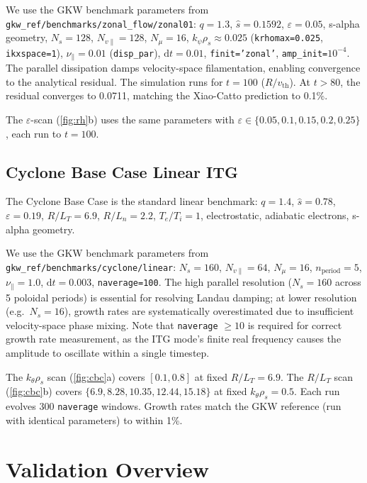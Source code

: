 \documentclass{article}
\theoremstyle{plain}
\theoremstyle{definition}
\theoremstyle{remark}
\begin{document}
We use the GKW benchmark parameters from \texttt{gkw\_ref/benchmarks/zonal\_flow/zonal01}: $q{=}1.3$, $\hat{s}{=}0.1592$, $\varepsilon{=}0.05$, s-alpha geometry, $N_s{=}128$, $N_{v\parallel}{=}128$, $N_\mu{=}16$, $k_\psi\rho_s{\approx}0.025$ (\texttt{krhomax=0.025}, \texttt{ikxspace=1}), $\nu_\parallel{=}0.01$ (\texttt{disp\_par}), $\mathrm{d}t{=}0.01$, \texttt{finit='zonal'}, \texttt{amp\_init=$10^{-4}$}. The parallel dissipation damps velocity-space filamentation, enabling convergence to the analytical residual. The simulation runs for $t{=}100$ ($R/v_\text{th}$). At $t{>}80$, the residual converges to 0.0711, matching the Xiao-Catto prediction to 0.1\%.

The $\varepsilon$-scan (\cref{fig:rh}b) uses the same parameters with $\varepsilon \in \{0.05, 0.1, 0.15, 0.2, 0.25\}$, each run to $t{=}100$.

\subsection{Cyclone Base Case Linear ITG}

The Cyclone Base Case \cite{cbc} is the standard linear benchmark: $q{=}1.4$, $\hat{s}{=}0.78$, $\varepsilon{=}0.19$, $R/L_T{=}6.9$, $R/L_n{=}2.2$, $T_e/T_i{=}1$, electrostatic, adiabatic electrons, s-alpha geometry.

We use the GKW benchmark parameters from \texttt{gkw\_ref/benchmarks/cyclone/linear}: $N_s{=}160$, $N_{v\parallel}{=}64$, $N_\mu{=}16$, $n_\text{period}{=}5$, $\nu_\parallel{=}1.0$, $\mathrm{d}t{=}0.003$, \texttt{naverage=100}. The high parallel resolution ($N_s{=}160$ across 5 poloidal periods) is essential for resolving Landau damping; at lower resolution (e.g.\ $N_s{=}16$), growth rates are systematically overestimated due to insufficient velocity-space phase mixing. Note that \texttt{naverage} $\geq 10$ is required for correct growth rate measurement, as the ITG mode's finite real frequency causes the amplitude to oscillate within a single timestep.

The $k_\theta\rho_s$ scan (\cref{fig:cbc}a) covers $[0.1, 0.8]$ at fixed $R/L_T{=}6.9$. The $R/L_T$ scan (\cref{fig:cbc}b) covers $\{6.9, 8.28, 10.35, 12.44, 15.18\}$ at fixed $k_\theta\rho_s{=}0.5$. Each run evolves 300 \texttt{naverage} windows. Growth rates match the GKW reference (run with identical parameters) to within 1\%.

\newpage
\section{Validation Overview}
\label{app:validation_overview}
\end{document}
